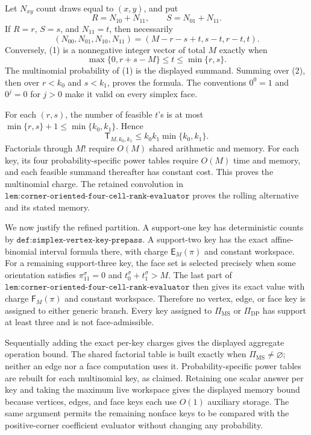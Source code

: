 Let \(N_{xy}\) count draws equal to \((x,y)\), and put
\[
R=N_{10}+N_{11},\qquad S=N_{01}+N_{11}.
\]
If \(R=r\), \(S=s\), and \(N_{11}=t\), then necessarily
\[
(N_{00},N_{01},N_{10},N_{11})
=(M-r-s+t,s-t,r-t,t).
\tag{1}
\]
Conversely, (1) is a nonnegative integer vector of total \(M\) exactly when
\[
\max\{0,r+s-M\}\le t\le\min\{r,s\}.
\tag{2}
\]
The multinomial probability of (1) is the displayed summand. Summing over (2), then over \(r<k_0\) and \(s<k_1\), proves the formula. The conventions \(0^0=1\) and \(0^j=0\) for \(j>0\) make it valid on every simplex face.

For each \((r,s)\), the number of feasible \(t\)'s is at most
\(\min\{r,s\}+1\le\min\{k_0,k_1\}\). Hence
\[
\mathsf T_{M,k_0,k_1}\le k_0k_1\min\{k_0,k_1\}.
\tag{3}
\]
Factorials through \(M!\) require \(O(M)\) shared arithmetic and memory. For each key, its four probability-specific power tables require \(O(M)\) time and memory, and each feasible summand thereafter has constant cost. This proves the multinomial charge. The retained convolution in
\(\texttt{lem:corner-oriented-four-cell-rank-evaluator}\) proves the rolling alternative and its stated memory.

We now justify the refined partition. A support-one key has deterministic counts by \(\texttt{def:simplex-vertex-key-prepass}\). A support-two key has the exact affine-binomial interval formula there, with charge \(\mathsf E_M(\pi)\) and constant workspace. For a remaining support-three key, the face set is selected precisely when some orientation satisfies
\(\pi^\sigma_{11}=0\) and \(t_0^\sigma+t_1^\sigma>M\). The last part of
\(\texttt{lem:corner-oriented-four-cell-rank-evaluator}\) then gives its exact value with charge \(\mathsf F_M(\pi)\) and constant workspace. Therefore no vertex, edge, or face key is assigned to either generic branch. Every key assigned to \(\Pi_{\mathrm{MS}}\) or \(\Pi_{\mathrm{DP}}\) has support at least three and is not face-admissible.

Sequentially adding the exact per-key charges gives the displayed aggregate operation bound. The shared factorial table is built exactly when
\(\Pi_{\mathrm{MS}}\ne\varnothing\); neither an edge nor a face computation uses it. Probability-specific power tables are rebuilt for each multinomial key, as claimed. Retaining one scalar answer per key and taking the maximum live workspace gives the displayed memory bound because vertices, edges, and face keys each use \(O(1)\) auxiliary storage. The same argument permits the remaining nonface keys to be compared with the positive-corner coefficient evaluator without changing any probability.